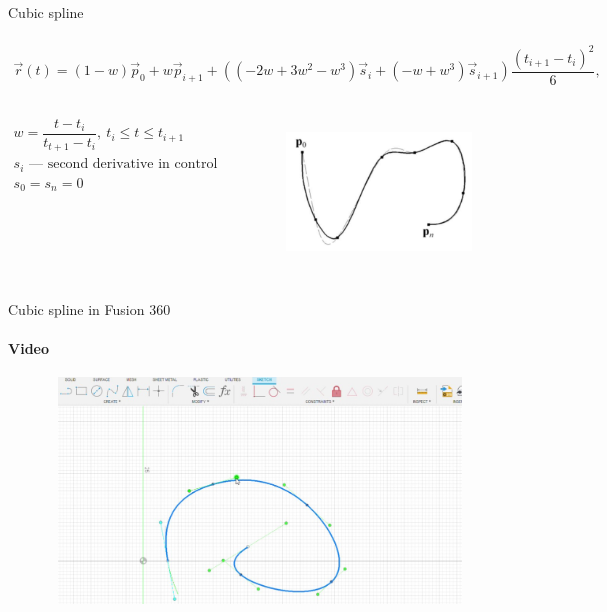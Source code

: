 \documentclass[aspectratio=169]{beamer}
\begin{document}
\begin{frame}[t]{Cubic spline}
\framesubtitle{}
\begin{align*}
    \vec{r}(t) = (1-w)\vec{p}_0 + w\vec{p}_{i+1} + ((-2w+3w^2-w^3)\vec{s}_i+(-w+w^3)\vec{s}_{i+1})\dfrac{(t_{i+1}-t_i)^2}{6},
\end{align*}
    \begin{columns}[T,onlytextwidth]
        \begin{column}{0.49\textwidth}
            \begin{align*}
                w=\dfrac{t-t_i}{t_{t+1}-t_i},\ t_i \leq t \leq t_{i+1} \\
                s_i \text{ --- second derivative in control points} \\ 
                s_0 = s_n = 0
            \end{align*}
        \end{column}
        \begin{column}{0.49\textwidth}
            \begin{figure}[H]
                \centering\includegraphics[height=4cm,width=1\textwidth,keepaspectratio]{cubic_spline_book.png}
                \label{fig:cubic_spline_book.png}
            \end{figure} 
        \end{column}
    \end{columns}
\end{frame}

\begin{frame}[t]{Cubic spline in Fusion 360}
    \framesubtitle{Video}
    \vspace{-0.6cm}
    \begin{figure}[H]
        \href{run:./videos/cubic_spline_video.mp4}{
            \centering\includegraphics[height=6cm,width=1\textwidth,keepaspectratio]{cubic_spline_video_preview.jpg}}
    \end{figure}
\end{frame}
\end{document}
